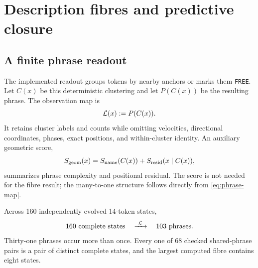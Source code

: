 \section{Description fibres and predictive closure}
\label{sec:description}

\subsection{A finite phrase readout}

The implemented readout groups tokens by nearby anchors or marks them \texttt{FREE}. Let \(C(x)\) be this deterministic clustering and let \(P(C(x))\) be the resulting phrase. The observation map is
\begin{equation}
\mathcal L(x):=P(C(x)).
\label{eq:phrase-map}
\end{equation}
It retains cluster labels and counts while omitting velocities, directional coordinates, phases, exact positions, and within-cluster identity. An auxiliary geometric score,
\begin{equation}
S_{\rm geom}(x)
=
S_{\rm name}(C(x))
+S_{\rm resid}(x\mid C(x)),
\label{eq:geometric-score}
\end{equation}
summarizes phrase complexity and positional residual. The score is not needed for the fibre result; the many-to-one structure follows directly from \cref{eq:phrase-map}.

Across 160 independently evolved 14-token states,
\begin{equation}
160\ \text{complete states}
\quad\xrightarrow{\ \mathcal L\ }\quad
103\ \text{phrases}.
\label{eq:phrase-census}
\end{equation}
Thirty-one phrases occur more than once. Every one of 68 checked shared-phrase pairs is a pair of distinct complete states, and the largest computed fibre contains eight states.

